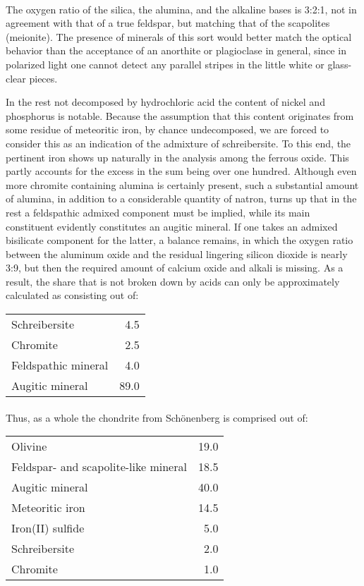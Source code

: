 \documentclass[a4paper, 12pt, oneside]{article}
\begin{document}
\paragraph*{}
The oxygen ratio of the silica, the alumina, and the alkaline bases is 3:2:1, not in agreement with that of a true feldspar, but matching that of the scapolites (meionite). The presence of minerals of this sort would better match the optical behavior than the acceptance of an anorthite or plagioclase in general, since in polarized light one cannot detect any parallel stripes in the little white or glass-clear pieces.

In the rest not decomposed by hydrochloric acid the content of nickel and phosphorus is notable. Because the assumption that this content originates from some residue of meteoritic iron, by chance undecomposed, we are forced to consider this as an indication of the admixture of schreibersite. To this end, the pertinent iron shows up naturally in the analysis among the ferrous oxide. This partly accounts for the excess in the sum being over one hundred. Although even more chromite containing alumina is certainly present, such a substantial amount of alumina, in addition to a considerable quantity of natron, turns up that in the rest a feldspathic admixed component must be implied, while its main constituent evidently constitutes an augitic mineral. If one takes an admixed bisilicate component for the latter, a balance remains, in which the oxygen ratio between the aluminum oxide and the residual lingering silicon dioxide is nearly 3:9, but then the required amount of calcium oxide and alkali is missing. As a result, the share that is not broken down by acids can only be approximately calculated as consisting out of:
\begin{center}
    \begin{tabular}{l r}
        Schreibersite & 4.5\\
        Chromite & 2.5\\
        Feldspathic mineral & 4.0\\
        Augitic mineral & 89.0\\
    \end{tabular}
\end{center}
\paragraph*{}
Thus, as a whole the chondrite from Schönenberg is comprised out of:
\begin{center}
    \begin{tabular}{l r}
        Olivine & 19.0\\
        Feldspar- and scapolite-like mineral & 18.5\\
        Augitic mineral & 40.0\\
        Meteoritic iron & 14.5\\
        Iron(II) sulfide & 5.0\\
        Schreibersite & 2.0\\
        Chromite & 1.0\\
    \end{tabular}
\end{center}
\end{document}
